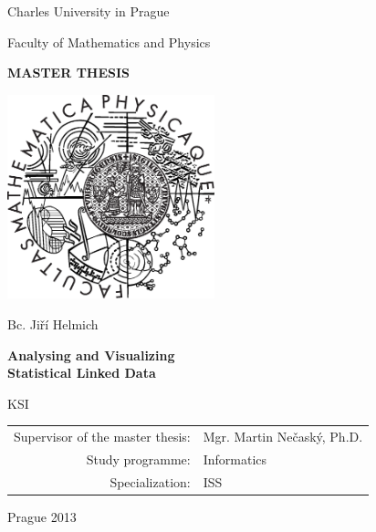 \documentclass[12pt,a4paper]{report}
\begin{document}


\pagestyle{empty}
\begin{center}

\large

Charles University in Prague

\medskip

Faculty of Mathematics and Physics

\vfill

{\bf\Large MASTER THESIS}

\vfill

\centerline{\mbox{\includegraphics[width=60mm]{img/logo.eps}}}

\vfill
\vspace{5mm}

{\LARGE Bc. Jiří Helmich}

\vspace{15mm}

{\LARGE\bfseries Analysing and Visualizing \\Statistical Linked Data}

\vfill

KSI

\vfill

\begin{tabular}{rl}

Supervisor of the master thesis: & Mgr. Martin Nečaský, Ph.D. \\
\noalign{\vspace{2mm}}
Study programme: & Informatics \\
\noalign{\vspace{2mm}}
Specialization: & ISS \\
\end{tabular}

\vfill

Prague 2013

\end{center}
\end{document}
